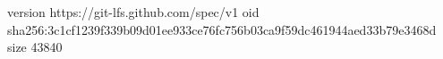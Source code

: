version https://git-lfs.github.com/spec/v1
oid sha256:3c1cf1239f339b09d01ee933ce76fc756b03ca9f59dc461944aed33b79e3468d
size 43840
